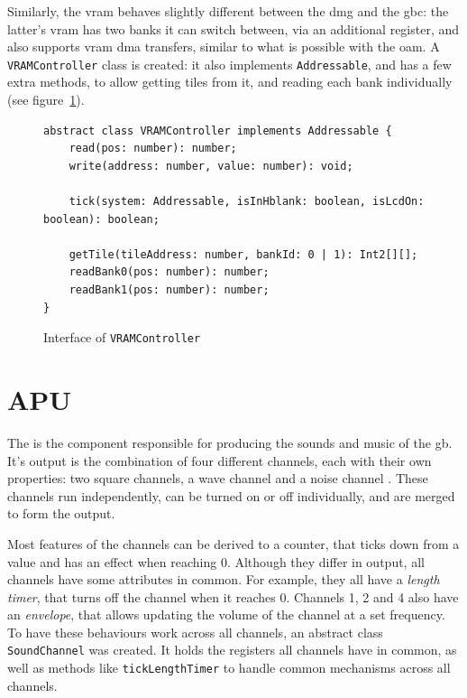 \documentclass[11pt]{informatics-report}
\begin{document}
Similarly, the \gls{vram} behaves slightly different between the \gls{dmg} and the \gls{gbc}: the latter's \gls{vram} has two banks it can switch between, via an additional register, and also supports \gls{vram} \gls{dma} transfers, similar to what is possible with the \gls{oam}. A \texttt{VRAMController} class is created: it also implements \texttt{Addressable}, and has a few extra methods, to allow getting tiles from it, and reading each bank individually (see figure~\ref{fig:vramcontroller-interface}).

\begin{figure}[h]
    \begin{verbatim}
abstract class VRAMController implements Addressable {
    read(pos: number): number;
    write(address: number, value: number): void;

    tick(system: Addressable, isInHblank: boolean, isLcdOn: boolean): boolean;

    getTile(tileAddress: number, bankId: 0 | 1): Int2[][];
    readBank0(pos: number): number;
    readBank1(pos: number): number;
}
    \end{verbatim}
    \caption{Interface of \texttt{VRAMController}}
    \label{fig:vramcontroller-interface}
\end{figure}


\section{APU}

The  is the component responsible for producing the sounds and music of the \gls{gb}. It's output is the combination of four different channels, each with their own properties: two square channels, a wave channel and a noise channel \cite[Audio]{pandoc}. These channels run independently, can be turned on or off individually, and are merged to form the output.

 Most features of the channels can be derived to a counter, that ticks down from a value and has an effect when reaching 0. Although they differ in output, all channels have some attributes in common. For example, they all have a \textit{length timer}, that turns off the channel when it reaches 0. Channels 1, 2 and 4 also have an \textit{envelope}, that allows updating the volume of the channel at a set frequency. To have these behaviours work across all channels, an abstract class \texttt{SoundChannel} was created. It holds the registers all channels have in common, as well as methods like \texttt{tickLengthTimer} to handle common mechanisms across all channels.
\end{document}
